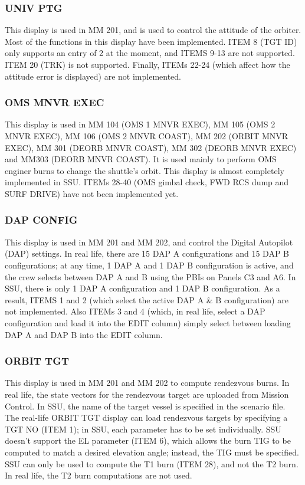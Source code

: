 \documentclass[Space_Shuttle_Ultra_Manual.tex]{subfiles}
\begin{document}
\begin{multicols*}{2}
\subsubsection{UNIV PTG}
This display is used in MM 201, and is used to control the attitude of the orbiter. Most of the functions in this display have been implemented. ITEM 8 (TGT ID) only supports an entry of 2 at the moment, and ITEMS 9-13 are not supported. ITEM 20 (TRK) is not supported. Finally, ITEMs 22-24 (which affect how the attitude error is displayed) are not implemented.

\subsubsection{OMS MNVR EXEC}
This display is used in MM 104 (OMS 1 MNVR EXEC), MM 105 (OMS 2 MNVR EXEC), MM 106 (OMS 2 MNVR COAST), MM 202 (ORBIT MNVR EXEC), MM 301 (DEORB MNVR COAST), MM 302 (DEORB MNVR EXEC) and MM303 (DEORB MNVR COAST). It is used mainly to perform OMS enginer burns to change the shuttle's orbit.
This display is almost completely implemented in SSU. ITEMs 28-40 (OMS gimbal check, FWD RCS dump and SURF DRIVE) have not been implemented yet.

\subsubsection{DAP CONFIG}
This display is used in MM 201 and MM 202, and control the Digital Autopilot (DAP) settings. In real life, there are 15 DAP A configurations and 15 DAP B configurations; at any time, 1 DAP A and 1 DAP B configuration is active, and the crew selects between DAP A and B using the PBIs on Panels C3 and A6. In SSU, there is only 1 DAP A configuration and 1 DAP B configuration. As a result, ITEMS 1 and 2 (which select the active DAP A \& B configuration) are not implemented. Also ITEMs 3 and 4 (which, in real life, select a DAP configuration and load it into the EDIT column) simply select between loading DAP A and DAP B into the EDIT column.

\subsubsection{ORBIT TGT}
This display is used in MM 201 and MM 202 to compute rendezvous burns. In real life, the state vectors for the rendezvous target are uploaded from Mission Control. In SSU, the name of the target vessel is specified in the scenario file.
The real-life ORBIT TGT display can load rendezvous targets by specifying a TGT NO (ITEM 1); in SSU, each parameter has to be set individually. SSU doesn't support the EL parameter (ITEM 6), which allows the burn TIG to be computed to match a desired elevation angle; instead, the TIG must be specified.
SSU can only be used to compute the T1 burn (ITEM 28), and not the T2 burn. In real life, the T2 burn computations are not used.


\end{multicols*}
\end{document}
